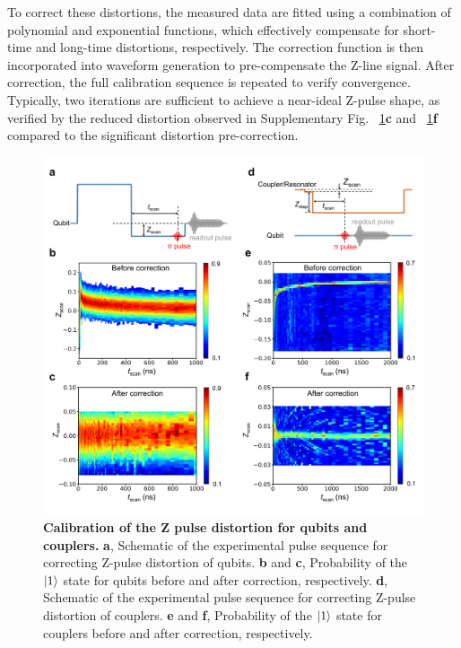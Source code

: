 \documentclass[reprint,superscriptaddress,preprintnumbers,longbibliography,
amsmath,amssymb,aps,floatfix,pra,twocolumn, tightenlines %
]{revtex4-2}
\begin{document}
    To correct these distortions, the measured data are fitted using a combination of polynomial and exponential functions, which effectively compensate for short-time and long-time distortions, respectively. The correction function is then incorporated into waveform generation to pre-compensate the Z-line signal. After correction, the full calibration sequence is repeated to verify convergence. Typically, two iterations are sufficient to achieve a near-ideal Z-pulse shape, as verified by the reduced distortion observed in Supplementary Fig. ~\ref{pulseshape}\textbf{c} and ~\ref{pulseshape}\textbf{f} compared to the significant distortion pre-correction.
    

	\begin{figure}
		\centering
		\includegraphics[width=1.0\linewidth]{suppFig/FigureSI_pulseshape.pdf}
		\caption{\textbf{Calibration of the Z pulse distortion for qubits and couplers.} \textbf{a}, Schematic of the experimental pulse sequence for correcting Z-pulse distortion of qubits.
		\textbf{b} and \textbf{c}, Probability of the $\ket{1}$ state for qubits before and after correction, respectively.
		\textbf{d}, Schematic of the experimental pulse sequence for correcting Z-pulse distortion of couplers. \textbf{e} and \textbf{f}, Probability of the $\ket{1}$ state for couplers before and after correction, respectively.}
		\label{pulseshape}
	\end{figure}
	
\end{document}
